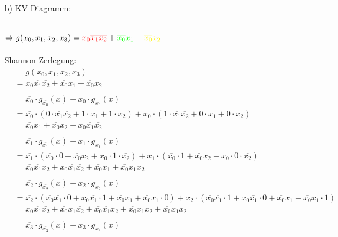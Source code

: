 \documentclass{article}
\newcommand{\nyet}{\overline}
\begin{document}
\begin{enumerate}
		\item[b)]
		KV-Diagramm:\\
		\begin{karnaugh-map}[4][4][1][$x_2, x_0$][$x_3, x_1$]
		\end{karnaugh-map}\\
		$\Rightarrow g(x_0, x_1, x_2, x_3) = \textcolor{red}{x_0 \nyet{x_1} \nyet{x_2}} + \textcolor{green}{\nyet{x_0} x_1} + \textcolor{yellow}{\nyet{x_0} x_2}$ \\\\
		Shannon-Zerlegung:
		\begin{align*}
			&\phantom{=} g(x_0, x_1, x_2, x_3) \\
			&= x_0 \nyet{x_1} \nyet{x_2} + \nyet{x_0} x_1 + \nyet{x_0} x_2 \\\\
			&= \nyet{x_0} \cdot g_{\nyet{x_0}}(x) + x_0 \cdot g_{x_0}(x) \\
			&= \nyet{x_0} \cdot (0\cdot \nyet{x_1} \nyet{x_2} + 1\cdot x_1 + 1\cdot x_2) + x_0 \cdot (1\cdot \nyet{x_1} \nyet{x_2} + 0\cdot x_1 + 0\cdot x_2) \\
			&= \nyet{x_0} x_1 + \nyet{x_0} x_2 +  x_0 \nyet{x_1} \nyet{x_2} \\\\
			&= \nyet{x_1} \cdot g_{\nyet{x_1}}(x) + x_1 \cdot g_{x_1}(x) \\
			&= \nyet{x_1} \cdot (\nyet{x_0} \cdot 0 + \nyet{x_0} x_2 +  x_0 \cdot 1 \cdot \nyet{x_2}) + x_1 \cdot (\nyet{x_0} \cdot 1 + \nyet{x_0} x_2 +  x_0 \cdot 0 \cdot \nyet{x_2}) \\
			&= \nyet{x_0} \nyet{x_1} x_2 + x_0 \nyet{x_1} \nyet{x_2} + \nyet{x_0} x_1 + \nyet{x_0} x_1 x_2 \\\\
			&= \nyet{x_2} \cdot g_{\nyet{x_2}}(x) + x_2 \cdot g_{x_2}(x) \\
			&= \nyet{x_2} \cdot (\nyet{x_0} \nyet{x_1} \cdot 0 + x_0 \nyet{x_1} \cdot 1 + \nyet{x_0} x_1 + \nyet{x_0} x_1 \cdot 0) + x_2 \cdot (\nyet{x_0} \nyet{x_1} \cdot 1 + x_0 \nyet{x_1} \cdot 0 + \nyet{x_0} x_1 + \nyet{x_0} x_1 \cdot 1) \\
			&= x_0 \nyet{x_1} \nyet{x_2} + \nyet{x_0} x_1 \nyet{x_2} + \nyet{x_0} \nyet{x_1} x_2 + \nyet{x_0} x_1 x_2 + \nyet{x_0} x_1 x_2 \\\\
			&= \nyet{x_3} \cdot g_{\nyet{x_3}}(x) + x_3 \cdot g_{x_3}(x) \\

\end{align*}
\end{enumerate}
\end{document}
